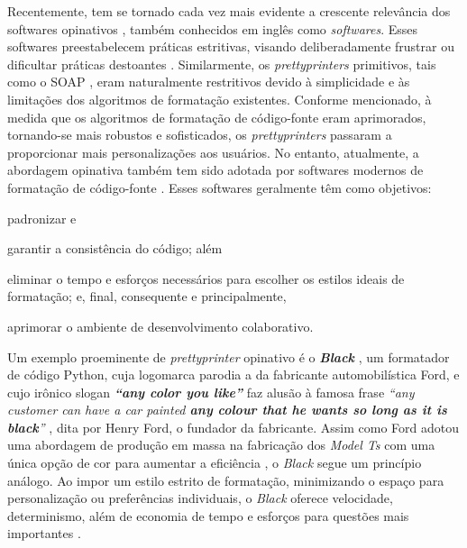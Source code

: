 \documentclass
  [11pt,a4paper,english,brazil,openright,sumario=tradicional,twoside]
  {abntex2}
\begin{document}
  Recentemente, tem se tornado cada vez mais evidente a crescente relevância
  dos softwares opinativos \cite{eccles-2015-rise}, também conhecidos em inglês
  como \textit{ softwares}. Esses softwares preestabelecem
  práticas estritivas, visando deliberadamente frustrar ou dificultar práticas
  destoantes \cite{lance-2021-about}. Similarmente, os \textit{prettyprinters}
  primitivos, tais como o SOAP \cite{scowen-1971-soap}, eram naturalmente
  restritivos devido à simplicidade e às limitações dos algoritmos de
  formatação existentes. Conforme mencionado, à medida que os algoritmos de
  formatação de código-fonte eram aprimorados, tornando-se mais robustos e
  sofisticados, os \textit{prettyprinters} passaram a proporcionar mais
  personalizações aos usuários. No entanto, atualmente, a abordagem opinativa
  também tem sido adotada por softwares modernos de formatação de código-fonte
  \cites{black-2023-black}[5--6,8]{griesemer-2022-cultural}. Esses softwares
  geralmente têm como objetivos:
  \begin{inparaenum}
    \item padronizar e
    \item garantir a consistência do código; além
    \item eliminar o tempo e esforços necessários para escolher os estilos
          ideais de formatação; e, final, consequente e principalmente,
    \item aprimorar o ambiente de desenvolvimento colaborativo.
  \end{inparaenum}

  Um exemplo proeminente de \textit{prettyprinter} opinativo é o
  \textit{\textbf{Black}} \cite{black-2023-black}, um formatador de código
  Python, cuja logomarca parodia a da fabricante automobilística Ford, e cujo
  irônico slogan \textit{\textbf{``any color you like''}} faz alusão à famosa
  frase
  \textit
    {%
      ``any customer can have a car painted \textbf{any colour that he wants so
      long as it is black}''}
  \cite[p. 72, grifo nosso]{ford-1922-my}, dita por Henry Ford, o fundador da
  fabricante. Assim como Ford adotou uma abordagem de produção em massa na
  fabricação dos \textit{Model Ts} com uma única opção de cor para aumentar a
  eficiência \cite{ford-1922-my}, o \textit{Black} segue um princípio análogo.
  Ao impor um estilo estrito de formatação, minimizando o espaço para
  personalização ou preferências individuais, o \textit{Black} oferece
  velocidade, determinismo, além de economia de tempo e esforços para questões
  mais importantes \cite{black-2023-black}.
\end{document}
